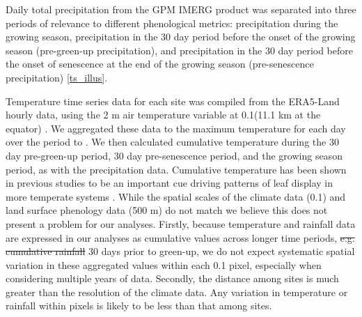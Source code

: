\documentclass[11pt,a4paper]{article}
\providecommand{\DIFaddtex}[1]{{\protect\color{blue}\uwave{#1}}} %
\providecommand{\DIFdeltex}[1]{{\protect\color{red}\sout{#1}}}                      %
\providecommand{\DIFaddbegin}{} %
\providecommand{\DIFaddend}{} %
\providecommand{\DIFdelbegin}{} %
\providecommand{\DIFdelend}{} %
\providecommand{\DIFadd}[1]{\texorpdfstring{\DIFaddtex{#1}}{#1}} %
\providecommand{\DIFdel}[1]{\texorpdfstring{\DIFdeltex{#1}}{}} %
\newcommand{\DIFscaledelfig}{0.5}
\newlength{\DIFdelgraphicswidth} %
\newlength{\DIFdelgraphicsheight} %
\newcommand{\DIFaddincludegraphics}[2][]{{\color{blue}\fbox{\DIFOincludegraphics[#1]{#2}}}} %
\newcommand{\DIFdelincludegraphics}[2][]{%
\sbox{\DIFdelgraphicsbox}{\DIFOincludegraphics[#1]{#2}}%
\settoboxwidth{\DIFdelgraphicswidth}{\DIFdelgraphicsbox} %
\settoboxtotalheight{\DIFdelgraphicsheight}{\DIFdelgraphicsbox} %
\scalebox{\DIFscaledelfig}{%
\parbox[b]{\DIFdelgraphicswidth}{\usebox{\DIFdelgraphicsbox}\\[-\baselineskip] \rule{\DIFdelgraphicswidth}{0em}}\llap{\resizebox{\DIFdelgraphicswidth}{\DIFdelgraphicsheight}{%
\setlength{\unitlength}{\DIFdelgraphicswidth}%
\begin{picture}(1,1)%
\thicklines\linethickness{2pt} %
{\color[rgb]{1,0,0}\put(0,0){\framebox(1,1){}}}%
{\color[rgb]{1,0,0}\put(0,0){\line( 1,1){1}}}%
{\color[rgb]{1,0,0}\put(0,1){\line(1,-1){1}}}%
\end{picture}%
}\hspace*{3pt}}} %
} %
\DeclareRobustCommand{\DIFaddbegin}{\DIFOaddbegin \let\includegraphics\DIFaddincludegraphics} %
\DeclareRobustCommand{\DIFaddend}{\DIFOaddend \let\includegraphics\DIFOincludegraphics} %
\DeclareRobustCommand{\DIFdelbegin}{\DIFOdelbegin \let\includegraphics\DIFdelincludegraphics} %
\DeclareRobustCommand{\DIFdelend}{\DIFOaddend \let\includegraphics\DIFOincludegraphics} %
\begin{document}
Daily total precipitation from the GPM IMERG product was separated into three
periods of relevance to different phenological metrics: precipitation during
the growing season, precipitation in the 30 day period before the onset of the
growing season (pre-green-up precipitation), and precipitation in the 30 day
period before the onset of senescence at the end of the growing season
(pre-senescence precipitation) \DIFaddbegin \DIFadd{(}\autoref{ts_illus}\DIFadd{)}\DIFaddend . 

Temperature time series data for each site was compiled from the ERA5-Land
hourly data, using the 2 m air temperature variable at 0.1\textdegree (11.1 km
at the equator) \citep{ERA5}. We aggregated these data to the maximum
temperature for each day over the period \modisStart{} to \modisEnd{}. We then
calculated cumulative temperature during the 30 day pre-green-up period, 30 day
pre-senescence period, and the growing season period, as with the precipitation
data. Cumulative temperature has been shown in previous studies to be an
important cue driving patterns of leaf display in more temperate systems
\citep{Archibald2007, Michelson2017, Escamilla2020}. While the spatial scales
of the climate data (0.1\textdegree{}) and land surface phenology data (500 m)
do not match we believe this does not present a problem for our analyses.
Firstly, because temperature and rainfall data are expressed in our analyses as
cumulative values across longer time periods, \DIFdelbegin \DIFdel{e.g. cumulative rainfall }\DIFdelend \DIFaddbegin \DIFadd{for example cumulative rainfall over the }\DIFaddend 30 days
prior to green-up, we do not expect systematic spatial variation in these
aggregated values within each 0.1\textdegree{} pixel, especially when
considering multiple years of data. Secondly, the distance among sites is much
greater than the resolution of the climate data. Any variation in temperature
or rainfall within pixels is likely to be less than that among sites.
\end{document}
